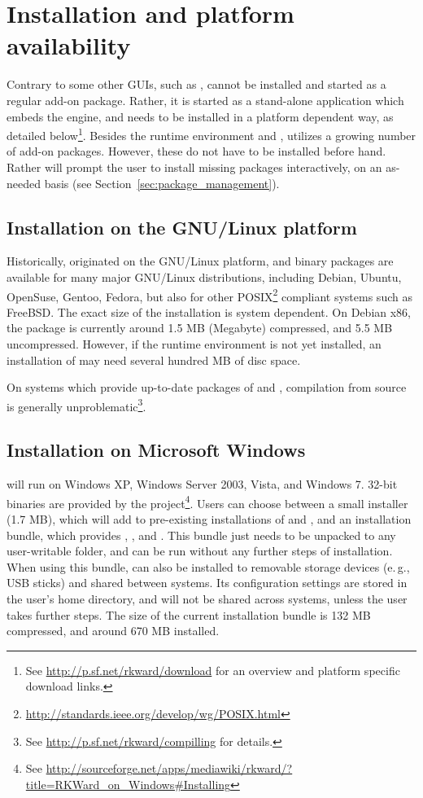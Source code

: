 \section{Installation and platform availability}
\label{sec:installing_starting_RKWard}
Contrary to some other  GUIs, such as ,  cannot be installed and started as a
regular  add-on package. Rather, it is started as a stand-alone application which embeds the
 engine, and needs to be installed in a platform dependent way, as detailed below\footnote{
  See \url{http://p.sf.net/rkward/download} for an overview and platform specific download links.
}. Besides the
 runtime environment and ,  utilizes a growing number of  add-on packages.
However, these do not have to be installed before hand. Rather  will prompt the user to install
missing packages interactively, on an as-needed basis (see Section~\ref{sec:package_management}).

\subsection{Installation on the GNU/Linux platform}
Historically,  originated on the GNU/Linux platform, and binary packages are available for many
major GNU/Linux distributions, including Debian, Ubuntu, OpenSuse, Gentoo, Fedora, but also for other POSIX\footnote{
\url{http://standards.ieee.org/develop/wg/POSIX.html}
}
compliant systems such as FreeBSD.  The exact size of the installation is system dependent. On Debian x86, the
package is currently around 1.5 MB (Megabyte) compressed, and 5.5 MB uncompressed. However, if the 
runtime environment is not yet installed, an installation of  may need several hundred MB of disc
space.

On systems which provide up-to-date packages of  and , compilation from source is
generally unproblematic\footnote{
  See \url{http://p.sf.net/rkward/compilling} for details.
}.

\subsection{Installation on Microsoft Windows}
 will run on Windows XP, Windows Server 2003, Vista, and Windows 7. 32-bit binaries are
provided by the project\footnote{
  See \url{http://sourceforge.net/apps/mediawiki/rkward/?title=RKWard\_on\_Windows\#Installing}
}. Users can
choose between a small installer (1.7 MB), which will add  to pre-existing installations of
 and , and an installation bundle, which provides , , and
. This bundle just needs to be unpacked to any user-writable folder, and can be run without any
further steps of installation. When using this bundle,  can also be installed to removable storage
devices (e.\,g., USB sticks) and shared between systems. Its configuration settings are stored in the user's
home directory, and will not be shared across systems, unless the user takes further steps. The size of the
current installation bundle is 132 MB compressed, and around 670 MB installed.


